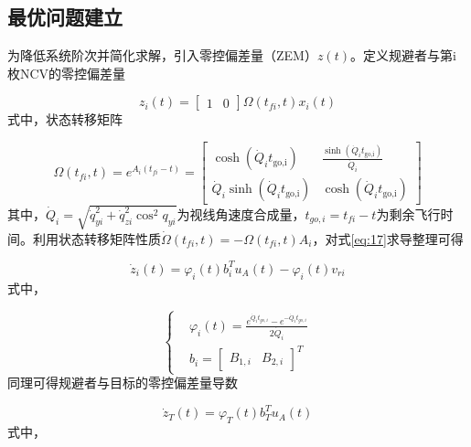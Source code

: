 \subsection{最优问题建立}
为降低系统阶次并简化求解，引入零控偏差量（ZEM）$z(t)$。定义规避者与第i枚NCV的零控偏差量

\begin{equation}
\label{eq:17}
{z_i}(t) = \left[ {\begin{array}{*{20}{c}}
  1&0 
\end{array}} \right]\Omega \left( {{t_{fi}},t} \right){x_i}(t)
\end{equation}
式中，状态转移矩阵

\begin{equation}
\label{eq:18}
\Omega \left( {{t_{fi}},t} \right) = {e^{{A_i}\left( {{t_{fi}} - t} \right)}} = \left[ {\begin{array}{*{20}{c}}
  {\cosh ({{\dot Q}_i}{t_{{\text{go,i}}}})}&{\frac{{\sinh ({{\dot Q}_i}{t_{{\text{go,i}}}})}}{{{{\dot Q}_i}}}} \\ 
  {{{\dot Q}_i}\sinh ({{\dot Q}_i}{t_{{\text{go,i}}}})}&{\cosh ({{\dot Q}_i}{t_{{\text{go,i}}}})} 
\end{array}} \right]
\end{equation}
其中，${\dot Q_i} = \sqrt {\dot q_{yi}^2 + \dot q_{zi}^2{{\cos }^2}{q_{yi}}} $为视线角速度合成量，${t_{go,i}} = {t_{fi}} - t$为剩余飞行时间。利用状态转移矩阵性质$\dot \Omega \left( {{t_{fi}},t} \right) =  - \Omega \left( {{t_{fi}},t} \right){A_i}$，对式\eqref{eq:17}求导整理可得

\begin{equation}
\label{eq:19}
{\dot z_i}(t) = {\varphi _i}(t)b_i^T{u_A}(t) - {\varphi _i}(t){v_{ri}}
\end{equation}
式中，

\begin{equation}
\label{eq:20}
\left\{
\begin{aligned}
& {\varphi _i}(t) = \frac{{{e^{{{\dot Q}_i}{t_{go,i}}}} - {e^{ - {{\dot Q}_i}{t_{go,i}}}}}}{{2{{\dot Q}_i}}} \\
& {b_i} = {\left[ {\begin{array}{*{20}{c}}
  {{B_{1,i}}}&{{B_{2,i}}}
\end{array}} \right]^T}
\end{aligned}
\right.
\end{equation}
同理可得规避者与目标的零控偏差量导数

\begin{equation}
\label{eq:21}
{\dot z_T}(t) = {\varphi _T}(t)b_T^T{u_A}(t)
\end{equation}
式中，

